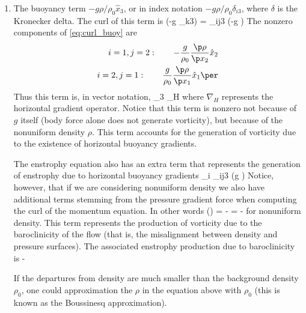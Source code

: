 \documentclass[11pt]{article}
\begin{document}
\begin{enumerate}[label=(\alph*)]
\item The buoyancy term $-g\rho/\rho_0 \hat{x}_3$, or in index notation $-g\rho/\rho_0 \delta_{i3}$, where $\delta$ is the Kronecker delta. The curl of this term is
    \beq
        \label{eq:curl_buoy}
        \eijk {}\left(-g \delta_{k3}\right) = \varepsilon_{ij3}  \left(-g \right)\per
    \eeq
     The nonzero components of \eqref{eq:curl_buoy} are
     \begin{align}
     i=1,j=2:\qquad -\frac{g}{\rho_0} \frac{\p \rho}{\p x_2} \hat{x}_2\nonumber \\
     i=2,j=1:\qquad  \frac{g}{\rho_0} \frac{\p \rho}{\p x_1}\hat{x}_1\per
    \end{align}
    Thus this term is, in vector notation,
    \beq
         _3 \times \nabla_{H} \rho\com 
    \eeq
    where $\nabla_H$ represents the horizontal gradient operator. Notice that this term is nonzero not because of $g$ itself (body force alone does not generate vorticity), but because of the nonuniform density $\rho$. This term accounts for the generation of vorticity due to the existence of horizontal buoyancy gradients.

    The enstrophy equation also has an extra term that represents the generation of enstrophy due to horizontal buoyancy gradients
     \omega_i \varepsilon_{ij3}  \left(g \right)\per
    \eeq
    Notice, however, that if we are considering nonuniform density we also have additional terms stemming from the pressure gradient force when computing the curl of the momentum equation. In other words
    \beq
    \nabla \times \left(\right) = - = -\eijk {} 
    \eeq
    for nonuniform density. This term represents the production of vorticity due to the baroclinicity of the flow (that is, the misalignment between density and pressure surfaces). The associated enstrophy production due to baroclinicity is
    \beq
       -\eijk {} \per
    \eeq
    
    
    If the departures from density are much smaller than the background density $\rho_0$, one could approximation the $\rho$ in the equation above with $\rho_0$ (this is known as the Boussinesq approximation).  

    \end{enumerate}
\end{document}
